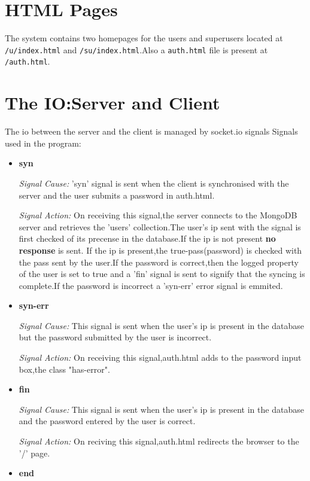 \documentclass[a4paper,10pt]{article}
\begin{document}
\section{HTML Pages}
The system contains two homepages for the users and superusers located at
\texttt{/u/index.html} and \texttt{/su/index.html}.Also a \texttt{auth.html} file
is present at \texttt{/auth.html}.

\section{The IO:Server and Client}
The io between the server and the client is managed by socket.io signals
Signals used in the program:
\begin{itemize}
 
\item \textbf{syn}

\textit{Signal Cause:}
'syn' signal is sent when the client is synchronised with the server and the 
user submits a password in auth.html.

\textit{Signal Action:}
    On receiving this signal,the server connects to the MongoDB server
and retrieves the 'users' collection.The user's ip sent with the signal 
is first checked of its precense in the database.If the ip is not present \textbf{no response} is sent.
    If the ip is present,the true-pass(password) is checked with the pass sent
by the user.If the password is correct,then the logged property of the user is set
to true and a 'fin' signal is sent to signify that the syncing is complete.If the 
password is incorrect a 'syn-err' error signal is emmited.


\item \textbf{syn-err}

\textit{Signal Cause:}
    This signal is sent when the user's ip is present in the database but the password
submitted by the user is incorrect.
    
\textit{Signal Action:}
    On receiving this signal,auth.html adds to the password input box,the class "has-error".


\item \textbf{fin}

\textit{Signal Cause:}
    This signal is sent when the user's ip is present in the database and the password
entered by the user is correct.

\textit{Signal Action:}
    On reciving this signal,auth.html redirects the browser to the '/' page.


\item \textbf{end}


\end{itemize}
\end{document}
